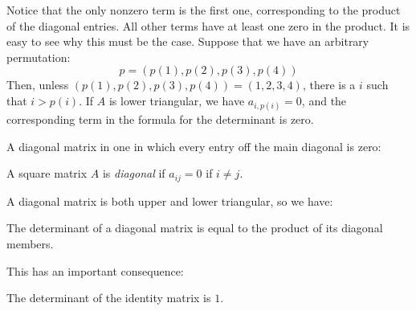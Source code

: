 \documentclass[12pt]{article}
\begin{document}
\begin{center}
\end{center}

Notice that the only nonzero term is the first one, corresponding to the product of the diagonal entries. All other terms have at least one zero in the product. It is easy to see why this must be the case. Suppose that we have an arbitrary permutation:
\[
p=(p(1),p(2),p(3),p(4))
\]
Then, unless $(p(1),p(2),p(3),p(4))=(1,2,3,4)$, there is a $i$ such that $i>p(i)$. If $A$ is lower triangular, we have $a_{i,p(i)}=0$, and the corresponding term in the formula for the determinant is zero.

A diagonal matrix in one in which every entry off the main diagonal is zero:

\begin{definition} A square matrix $A$ is \emph{diagonal} if $a_{ij}=0$ if $i\ne j$.
\end{definition}

A diagonal matrix is both upper and lower triangular, so we have:

\begin{theorem} The determinant of a diagonal matrix is equal to the product of its diagonal members. 
\end{theorem}

This has an important consequence:

\begin{theorem} The determinant of the identity matrix is $1$.
\end{theorem}
\end{document}
